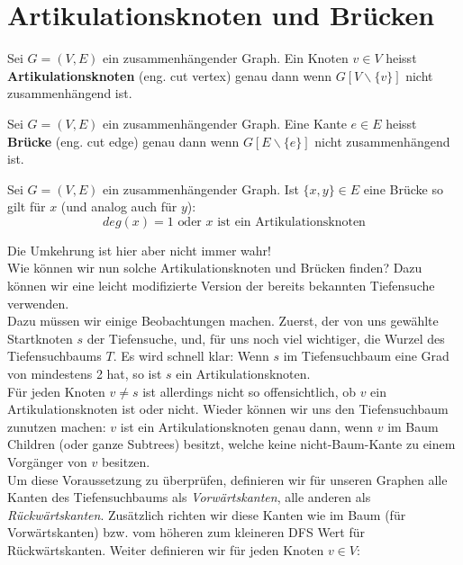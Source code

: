 \documentclass[a4paper]{report}
\begin{document}
\chapter{Artikulationsknoten und Brücken}

\begin{definition}
    Sei $G = (V,E)$ ein zusammenhängender Graph. Ein Knoten $v \in V$ heisst \textbf{Artikulationsknoten}
    (eng. cut vertex) genau dann wenn $G[V \backslash \{v\}]$ nicht zusammenhängend ist.
\end{definition}

\begin{definition}
    Sei $G = (V,E)$ ein zusammenhängender Graph. Eine Kante $e \in E$ heisst \textbf{Brücke}
    (eng. cut edge) genau dann wenn $G[E \backslash \{e\}]$ nicht zusammenhängend ist.
\end{definition}

\begin{lemma}
    Sei $G = (V,E)$ ein zusammenhängender Graph. Ist $\{x,y\} \in E$ eine Brücke so gilt für $x$
    (und analog auch für $y$): \\
    $$deg(x) = 1 \text{    oder    } x \text{ ist ein Artikulationsknoten}$$
\end{lemma}
\bigskip

Die Umkehrung ist hier aber nicht immer wahr! \\

Wie können wir nun solche Artikulationsknoten und Brücken finden? Dazu können
wir eine leicht modifizierte Version der bereits bekannten Tiefensuche verwenden. \\

Dazu müssen wir einige Beobachtungen machen. Zuerst, der von uns gewählte Startknoten $s$ der Tiefensuche,
und, für uns noch viel wichtiger, die Wurzel des Tiefensuchbaums $T$. Es wird schnell klar: Wenn $s$ im Tiefensuchbaum
eine Grad von mindestens 2 hat, so ist $s$ ein Artikulationsknoten. \\

Für jeden Knoten $v \neq s$ ist allerdings nicht so offensichtlich, ob $v$ ein Artikulationsknoten ist oder nicht.
Wieder können wir uns den Tiefensuchbaum zunutzen machen: $v$ ist ein Artikulationsknoten genau dann, wenn
$v$ im Baum Children (oder ganze Subtrees) besitzt, welche keine nicht-Baum-Kante zu einem Vorgänger von $v$ besitzen. \\

Um diese Voraussetzung zu überprüfen, definieren wir für unseren Graphen alle Kanten des Tiefensuchbaums als
\textit{Vorwärtskanten}, alle anderen als \textit{Rückwärtskanten}. Zusätzlich richten wir diese Kanten wie im Baum
(für Vorwärtskanten) bzw. vom höheren zum kleineren DFS Wert für Rückwärtskanten. Weiter definieren wir für jeden Knoten
$v \in V$: \\
\end{document}
